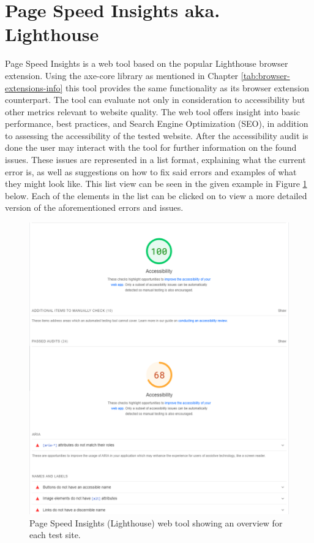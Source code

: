 \newpage

\section{Page Speed Insights aka. Lighthouse}

Page Speed Insights \parencite{PSIL} is a web tool based on the popular Lighthouse browser extension. Using the axe-core library as mentioned in Chapter \ref{tab:browser-extensions-info} this tool provides the same functionality as its browser extension counterpart. The tool can evaluate not only in consideration to accessibility but other metrics relevant to website quality. The web tool offers insight into basic performance, best practices, and Search Engine Optimization (SEO), in addition to assessing the accessibility of the tested website. After the accessibility audit is done the user may interact with the tool for further information on the found issues. These issues are represented in a list format, explaining what the current error is, as well as suggestions on how to fix said errors and examples of what they might look like. This list view can be seen in the given example in Figure \ref{fig:PSIL} below. Each of the elements in the list can be clicked on to view a more detailed version of the aforementioned errors and issues. 

\begin{figure}[h!]
    \centering
    \includegraphics[keepaspectratio,width=\linewidth,height=\halfh]
    {images/lighthouse.png}
    
    \caption[Page Speed Insights Overview]
    {%
    Page Speed Insights (Lighthouse) web tool showing an overview for each test site.
    }
    \label{fig:PSIL}
\end{figure}

